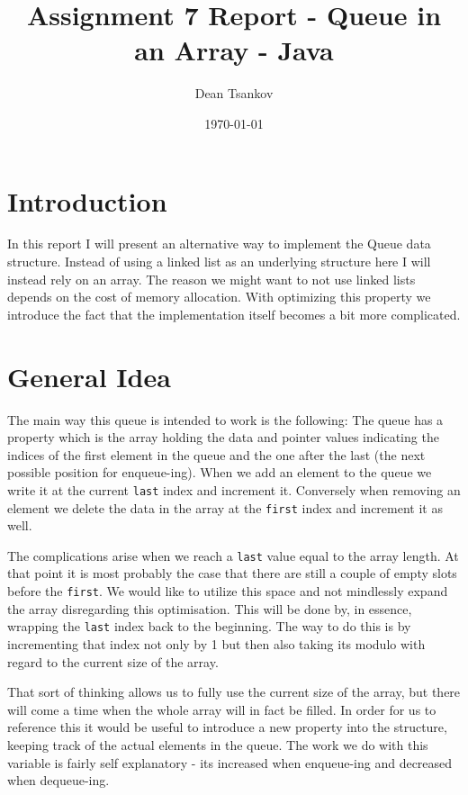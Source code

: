 \documentclass[a4paper,11pt]{article}
\begin{document}
\title{
    \textbf{Assignment 7 Report - Queue in an Array - Java}
}
\author{Dean Tsankov}
\date{\today}

\maketitle

\section*{Introduction}

In this report I will present an alternative way to implement the Queue data structure. Instead of using a linked list as an underlying structure here I will instead rely on an array. The reason we might want to not use linked lists depends on the cost of memory allocation. With optimizing this property we introduce the fact that the implementation itself becomes a bit more complicated.

\section*{General Idea}

The main way this queue is intended to work is the following: The queue has a property which is the array holding the data and pointer values indicating the indices of the first element in the queue and the one after the last (the next possible position for enqueue-ing). When we add an element to the queue we write it at the current {\tt last} index and increment it. Conversely when removing an element we delete the data in the array at the {\tt first} index and increment it as well. 

The complications arise when we reach a {\tt last} value equal to the array length. At that point it is most probably the case that there are still a couple of empty slots before the {\tt first}. We would like to utilize this space and not mindlessly expand the array disregarding this optimisation. This will be done by, in essence, wrapping the {\tt last} index back to the beginning. The way to do this is by incrementing that index not only by 1 but then also taking its modulo with regard to the current size of the array. 

That sort of thinking allows us to fully use the current size of the array, but there will come a time when the whole array will in fact be filled. In order for us to reference this it would be useful to introduce a new property into the structure, keeping track of the actual elements in the queue. The work we do with this variable is fairly self explanatory - its increased when enqueue-ing and decreased when dequeue-ing. 
\end{document}
